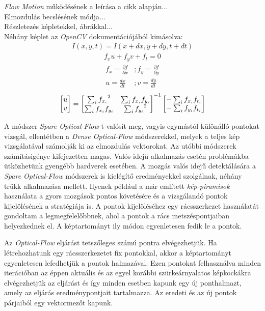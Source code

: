 \textit{Flow Motion} működésének a leírása a cikk alapján...\\
Elmozdulás becslésének módja...\\
Részletezés képletekkel, ábrákkal...\\
Néhány képlet az \textit{OpenCV} dokumentációjából kimásolva:
\begin{align*}
I(x,y,t) = I(x+dx,y+dy,t+dt)
\end{align*}
\begin{align*}
f_xu+f_yv+f_t=0
\end{align*}
\begin{align*}
f_x = \frac{\partial f}{\partial x} &; f_y = \frac{\partial f}{\partial y}\\
u = \frac{dx}{dt} &; v = \frac{dy}{dt}
\end{align*}
\begin{align*}
\bmatrix u \\ v \endbmatrix = {\bmatrix {\sum_{i}f_{x_i}}^2 & \sum_{i}f_{x_i}f_{y_i}\\ \sum_{i}f_{x_i}f_{y_i} & {\sum_{i}f_{y_i}}^2 \endbmatrix}^{-1} \bmatrix -\sum_{i}f_{x_i}f_{t_i} \\ -\sum_{i}f_{y_i}f_{t_i} \endbmatrix
\end{align*}

A módszer \textit{Spare Optical-Flow}-t valósít meg, vagyis egymástól különálló pontokat vizsgál, ellentétben a \textit{Dense Optical-Flow} módszerekkel, melyek a teljes kép vizsgálatával számolják ki az elmozdulás vektorokat. \cite{bradski2008learning} Az utóbbi módszerek számításigénye kifejezetten magas. Valós idejű alkalmazás esetén problémákba ütközhetünk gyengébb hardverek esetében. A mozgás valós idejű detektálására a \textit{Spare Optical-Flow} módszerek is kielégítő eredményekkel szolgálnak, néhány trükk alkalmazása mellett. Ilyenek például a már említett \textit{kép-piramisok} használata a gyors mozgások pontos követésére és a vizsgálandó pontok kijelölésének a stratégiája is. A pontok kijelöléséhez egy rácsszerkezet használatát gondoltam a legmegfelelőbbnek, ahol a pontok a rács metszéspontjaiban helyezkednek el. A képtartományt ily módon egyenletesen fedik le a pontok.


Az \textit{Optical-Flow} eljárást tetszőleges számú pontra elvégezhetjük. Ha létrehozhatunk egy rácsszerkezetet fix pontokkal, akkor a képtartományt egyenletesen lefedhetjük a pontok halmazával.
Ezen pontokat felhasználva minden iterációban az éppen aktuális és az egyel korábbi szürkeárnyalatos képkockákra elvégezhetjük az eljárást és így minden esetben kapunk egy új ponthalmazt, amely az eljárás eredménypontjait tartalmazza. Az eredeti és az új pontok párjaiból egy vektormezőt kapunk.

